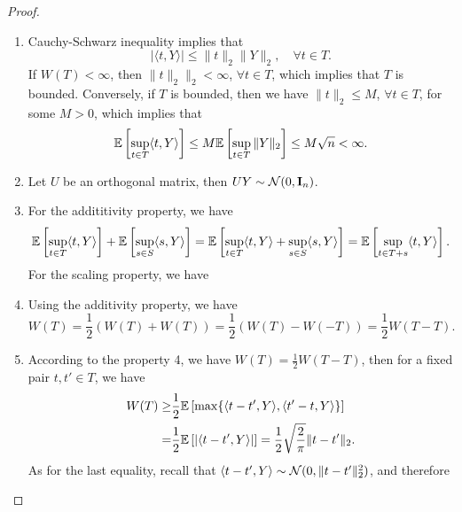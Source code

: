 \begin{proof}
	\begin{enumerate}
		\item Cauchy-Schwarz inequality implies that
		      \begin{equation*}
			      |\langle t,Y\rangle|\leq\|t\|_{2}\|Y\|_{2},\quad\forall t\in T.
		      \end{equation*}
		      If \(W(T)<\infty\), then \(\|t\|_{2}\|_{2}<\infty\), \(\forall t\in T\), which implies that \(T\) is bounded. Conversely, if \(T\) is bounded, then we have \(\|t\|_{2}\leq M\), \(\forall t\in T\), for some \(M>0\), which implies that
		      \begin{equation*}
			      \mathbb{E}\left[\sup_{t\in T}\langle t,Y\rangle\right]\leq M\mathbb{E}\left[\sup_{t\in T}\|Y\|_{2}\right]\leq M\sqrt{n}<\infty.
		      \end{equation*}
		\item Let \(U\) be an orthogonal matrix, then \(UY\sim\mathcal{N}(0,\mathbf{I}_{n})\).
		\item For the addititivity property, we have
		      \begin{equation*}
			      \mathbb{E}\left[\sup_{t\in T}\langle t,Y\rangle\right]+\mathbb{E}\left[\sup_{s\in S}\langle s,Y\rangle\right]=\mathbb{E}\left[\sup_{t\in T}\langle t,Y\rangle+\sup_{s\in S}\langle s,Y\rangle\right]=\mathbb{E}\left[\sup_{t\in T+s}\langle t,Y\rangle\right].
		      \end{equation*}
		      For the scaling property, we have
		\item Using the additivity property, we have
		      \begin{equation*}
			      W(T)=\frac{1}{2}(W(T)+W(T))=\frac{1}{2}(W(T)-W(-T))=\frac{1}{2}W(T-T).
		      \end{equation*}
		\item According to the property 4, we have \(W(T)=\frac{1}{2}W(T-T)\), then for a fixed pair \(t,t'\in T\), we have
		      \begin{equation*}
			      \begin{aligned}
				      W(T)\geq & \frac{1}{2}\mathbb{E}\left[\max\{\langle t-t',Y\rangle,\langle t'-t,Y\rangle\}\right]                  \\
				      =        & \frac{1}{2}\mathbb{E}\left[|\langle t-t',Y\rangle|\right]=\frac{1}{2}\sqrt{\frac{2}{\pi}}\|t-t'\|_{2}.
			      \end{aligned}
		      \end{equation*}
		      As for the last equality, recall that \(\langle t-t',Y\rangle\sim\mathcal{N}(0,\|t-t'\|_{2}^{2})\), and therefore

\end{enumerate}
\end{proof}
